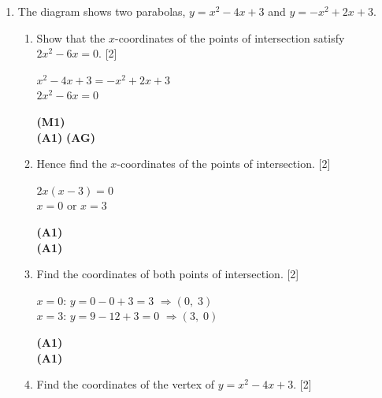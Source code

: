 \documentclass[12pt, twoside]{article}
\begin{document}
\begin{enumerate}[itemsep=0.2cm]
\newpage

\item The diagram shows two parabolas, $y = x^2 - 4x + 3$ and
$y = -x^2 + 2x + 3$.

\begin{enumerate}[itemsep=0.3cm]
  \item Show that the $x$-coordinates of the points of intersection
        satisfy $2x^2 - 6x = 0$. \hfill [2]

  \begin{minipage}[t]{0.62\textwidth}
  $x^2 - 4x + 3 = -x^2 + 2x + 3$\\[0.15cm]
  $2x^2 - 6x = 0$
  \end{minipage}%
  \begin{minipage}[t]{0.35\textwidth}\raggedleft
  \textbf{(M1)}\\[0.15cm]
  \textbf{(A1)} \textbf{(AG)}
  \end{minipage}

  \medskip
  \item Hence find the $x$-coordinates of the points of intersection. \hfill [2]

  \begin{minipage}[t]{0.62\textwidth}
  $2x(x - 3) = 0$\\[0.15cm]
  $x = 0$ or $x = 3$
  \end{minipage}%
  \begin{minipage}[t]{0.35\textwidth}\raggedleft
  \textbf{(A1)}\\[0.15cm]
  \textbf{(A1)}
  \end{minipage}

  \medskip
  \item Find the coordinates of both points of intersection. \hfill [2]

  \begin{minipage}[t]{0.62\textwidth}
  $x = 0$: \quad $y = 0 - 0 + 3 = 3$ \quad $\Rightarrow (0,\; 3)$\\[0.15cm]
  $x = 3$: \quad $y = 9 - 12 + 3 = 0$ \quad $\Rightarrow (3,\; 0)$
  \end{minipage}%
  \begin{minipage}[t]{0.35\textwidth}\raggedleft
  \textbf{(A1)}\\[0.15cm]
  \textbf{(A1)}
  \end{minipage}

  \medskip
  \item Find the coordinates of the vertex of $y = x^2 - 4x + 3$. \hfill [2]


\end{enumerate}
\end{enumerate}
\end{document}
